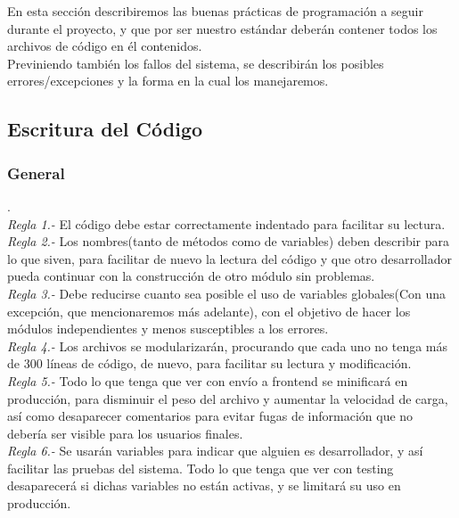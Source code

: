 
En esta sección describiremos las buenas prácticas de programación a seguir durante el proyecto, y que por ser nuestro estándar deberán contener todos los archivos de código en él contenidos. \\
Previniendo también los fallos del sistema, se describirán los posibles errores/excepciones y la forma en la cual los manejaremos. \\

\subsection{Escritura del Código}
	\subsubsection{General}
		.\\
		\textit{Regla 1.-} El código debe estar correctamente indentado para facilitar su lectura. \\
		\textit{Regla 2.-} Los nombres(tanto de métodos como de variables) deben describir para lo que siven, para facilitar de nuevo la lectura del código y que otro desarrollador pueda continuar con la construcción de otro módulo sin problemas. \\
		\textit{Regla 3.-} Debe reducirse cuanto sea posible el uso de variables globales(Con una excepción, que mencionaremos más adelante), con el objetivo de hacer los módulos independientes y menos susceptibles a los errores. \\
		\textit{Regla 4.-} Los archivos se modularizarán, procurando que cada uno no tenga más de 300 líneas de código, de nuevo, para facilitar su lectura y modificación. \\
		\textit{Regla 5.-} Todo lo que tenga que ver con envío a frontend se minificará en producción, para disminuir el peso del archivo y aumentar la velocidad de carga, así como desaparecer comentarios para evitar fugas de información que no debería ser visible para los usuarios finales. \\
		\textit{Regla 6.-}  Se usarán variables para indicar que alguien es desarrollador, y así facilitar las pruebas del sistema. Todo lo que tenga que ver con testing desaparecerá si dichas variables no están activas, y se limitará su uso en producción.

